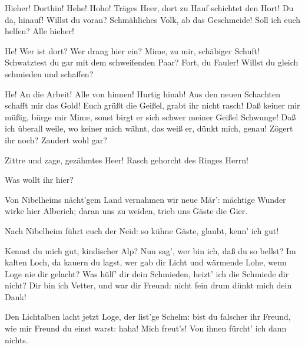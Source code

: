 \begin{drama}
\Alberichspeaks
Hieher! Dorthin! Hehe! Hoho!
Träges Heer, dort zu Hauf schichtet den Hort!
Du da, hinauf! Willst du voran?
Schmähliches Volk, ab das Geschmeide!
Soll ich euch helfen? Alle hieher!
 



He! Wer ist dort? Wer drang hier ein?
Mime, zu mir, schäbiger Schuft!
Schwatztest du gar mit dem schweifenden Paar?
Fort, du Fauler!
Willst du gleich schmieden und schaffen?
 



He! An die Arbeit!
Alle von hinnen! Hurtig hinab!
Aus den neuen Schachten schafft mir das Gold!
Euch grüßt die Geißel, grabt ihr nicht rasch!
Daß keiner mir müßig, bürge mir Mime,
sonst birgt er sich schwer meiner Geißel Schwunge!
Daß ich überall weile, wo keiner mich wähnt,
das weiß er, dünkt mich, genau!
Zögert ihr noch? Zaudert wohl gar?
 



Zittre und zage, gezähmtes Heer!
Rasch gehorcht des Ringes Herrn!
 




\Alberichspeaks


Was wollt ihr hier?
 

\Wotanspeaks
Von Nibelheims nächt'gem Land
vernahmen wir neue Mär':
mächtige Wunder wirke hier Alberich;
daran uns zu weiden, trieb uns Gäste die Gier.
 

\Alberichspeaks
Nach Nibelheim führt euch der Neid:
so kühne Gäste, glaubt, kenn' ich gut!
 

\Logespeaks
Kennst du mich gut, kindischer Alp?
Nun sag', wer bin ich, daß du so bellst?
Im kalten Loch, da kauern du lagst,
wer gab dir Licht und wärmende Lohe,
wenn Loge nie dir gelacht?
Was hülf' dir dein Schmieden,
heizt' ich die Schmiede dir nicht?
Dir bin ich Vetter, und war dir Freund:
nicht fein drum dünkt mich dein Dank!
 

\Alberichspeaks
Den Lichtalben lacht jetzt Loge,
der list'ge Schelm:
bist du falscher ihr Freund,
wie mir Freund du einst warst:
haha! Mich freut's!
Von ihnen fürcht' ich dann nichts.
 


\end{drama}
